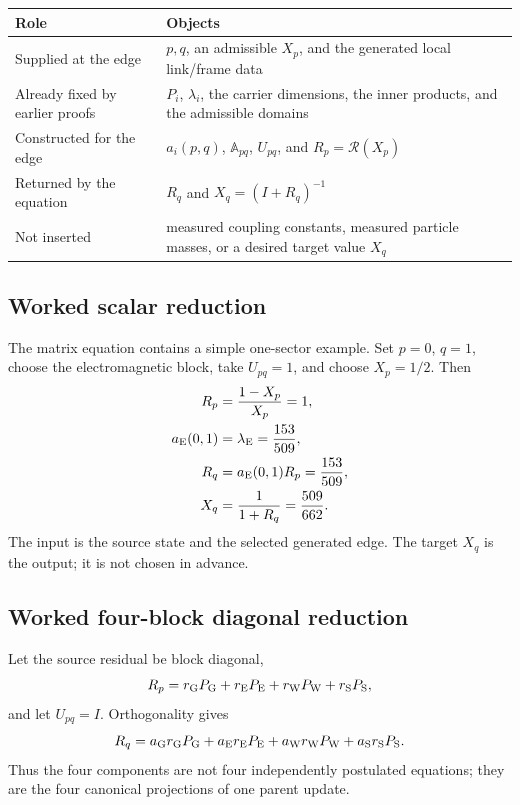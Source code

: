 \documentclass[11pt]{article}
\numberwithin{equation}{section}
\theoremstyle{remark}
\begin{document}
\begin{center}
\begin{tabular}{p{3.2cm}p{10.8cm}}
\toprule
Role & Objects\\
\midrule
Supplied at the edge & $p,q$, an admissible $X_p$, and the generated local link/frame data\\
Already fixed by earlier proofs & $P_i$, $\lambda_i$, the carrier dimensions, the inner products, and the admissible domains\\
Constructed for the edge & $a_i(p,q)$, $\mathbb A_{pq}$, $U_{pq}$, and $R_p=\mathcal R(X_p)$\\
Returned by the equation & $R_q$ and $X_q=(I+R_q)^{-1}$\\
Not inserted & measured coupling constants, measured particle masses, or a desired target value $X_q$\\
\bottomrule
\end{tabular}
\end{center}

\subsection*{Worked scalar reduction}
The matrix equation contains a simple one-sector example. Set $p=0$, $q=1$, choose the electromagnetic block, take $U_{pq}=1$, and choose $X_p=1/2$. Then
\begin{align}
R_p&=\frac{1-X_p}{X_p}=1,\\
a_{\rm E}(0,1)&=\lambda_{\rm E}=\frac{153}{509},\\
R_q&=a_{\rm E}(0,1)R_p=\frac{153}{509},\\
X_q&=\frac{1}{1+R_q}=\frac{509}{662}.
\end{align}
The input is the source state and the selected generated edge. The target $X_q$ is the output; it is not chosen in advance.

\subsection*{Worked four-block diagonal reduction}
Let the source residual be block diagonal,
\begin{equation}
R_p=r_{\rm G}P_{\rm G}+r_{\rm E}P_{\rm E}+r_{\rm W}P_{\rm W}+r_{\rm S}P_{\rm S},
\end{equation}
and let $U_{pq}=I$. Orthogonality gives
\begin{equation}
R_q=a_{\rm G}r_{\rm G}P_{\rm G}+a_{\rm E}r_{\rm E}P_{\rm E}+a_{\rm W}r_{\rm W}P_{\rm W}+a_{\rm S}r_{\rm S}P_{\rm S}.
\end{equation}
Thus the four components are not four independently postulated equations; they are the four canonical projections of one parent update.
\end{document}
